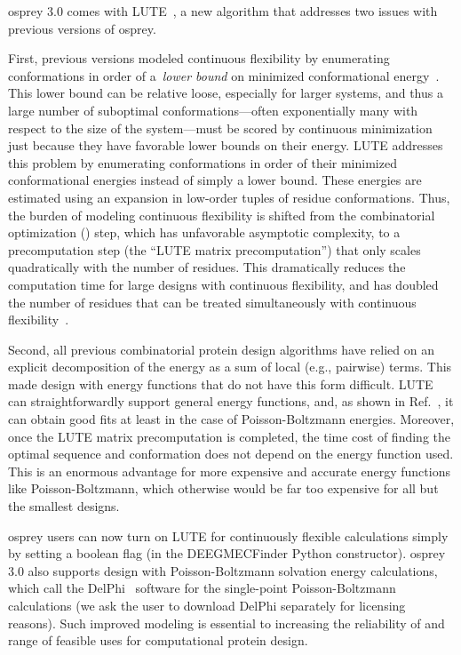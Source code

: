 {\sc osprey} 3.0 comes with LUTE~\cite{LUTE_RECOMB}, a new algorithm that addresses two issues with previous versions of {\sc osprey}.  

First, previous versions modeled continuous flexibility by enumerating conformations in order of a~\textit{lower bound} on minimized conformational energy~\cite{minDEE,iMinDEE}. This lower bound can be relative loose, especially for larger systems, and thus a large number of suboptimal conformations---often exponentially many with respect to the size of the system---must be scored by continuous minimization just because they have favorable lower bounds on their energy.  LUTE addresses this problem by enumerating conformations in order of their minimized conformational energies instead of simply a lower bound.  These energies are estimated using an expansion in low-order tuples of residue conformations.  Thus, the burden of modeling continuous flexibility is shifted from the combinatorial optimization (\as) step, which has unfavorable asymptotic complexity, to a precomputation step (the ``LUTE matrix precomputation'') that only scales quadratically with the number of residues. This dramatically reduces the computation time for large designs with continuous flexibility, and has doubled the number of residues that can be treated simultaneously with continuous flexibility~\cite{LUTE_RECOMB}.    

Second, all previous combinatorial protein design algorithms have relied on an explicit decomposition of the energy as a sum of local (e.g., pairwise) terms.  This made design with energy functions that do not have this form difficult. LUTE can straightforwardly support general energy functions, and, as shown in Ref.~, it can obtain good fits at least in the case of Poisson-Boltzmann energies.  Moreover, once the LUTE matrix precomputation is completed, the time cost of finding the optimal sequence and conformation does not depend on the energy function used.  This is an enormous advantage for more expensive and accurate energy functions like Poisson-Boltzmann, which otherwise would be far too expensive for all but the smallest designs.  

{\sc osprey} users can now turn on LUTE for continuously flexible calculations simply by setting a boolean flag (in the DEEGMECFinder Python constructor). 
{\sc osprey} 3.0 also supports design with Poisson-Boltzmann solvation energy calculations, which call the DelPhi~\cite{OSOR,DelPhi_surface} software for the single-point Poisson-Boltzmann calculations (we ask the user to download DelPhi separately for licensing reasons). Such improved modeling is essential to increasing the reliability of and range of feasible uses for computational protein design.  